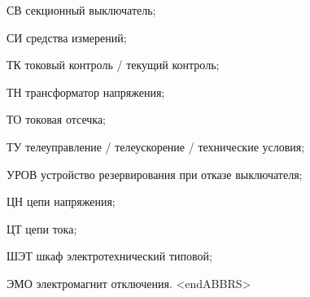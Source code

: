 \begin{list}{}
\item[СВ] секционный выключатель;
\item[СИ] средства измерений;
\item[ТК] токовый контроль / текущий контроль;
\item[ТН] трансформатор напряжения;
\item[ТО] токовая отсечка;
\item[ТУ] телеуправление / телеускорение / технические условия;
\item[УРОВ] устройство резервирования при отказе выключателя;
\item[ЦН] цепи напряжения;
\item[ЦТ] цепи тока;
\item[ШЭТ] шкаф электротехнический типовой;
\item[ЭМО] электромагнит отключения.
{\color{white}\fontsize{0.1pt}{0.1pt}\selectfont<endABBRS>}
\end{list}
